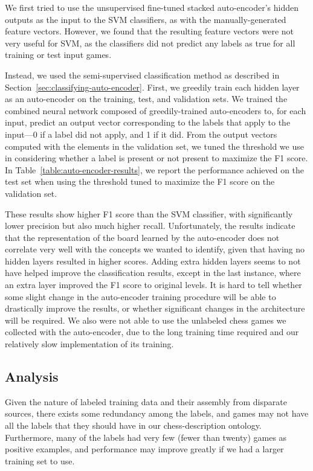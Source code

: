 \documentclass[11pt]{article}
\begin{document}
We first tried to use the unsupervised fine-tuned stacked auto-encoder's 
hidden outputs as the input to the SVM classifiers, as with the 
manually-generated feature vectors. However, we found that the resulting 
feature vectors were not very useful for SVM, as the classifiers did not 
predict any labels as true for all training or test input games.

Instead, we used the semi-supervised classification method as described 
in Section~\ref{sec:classifying-auto-encoder}. First, we greedily train 
each hidden layer as an auto-encoder on the training, test, and 
validation sets. We trained the combined neural network composed of 
greedily-trained auto-encoders to, for each input, predict an output 
vector corresponding to the labels that apply to the input---0 if a 
label did not apply, and 1 if it did. From the output vectors computed 
with the elements in the validation set, we tuned the threshold we use 
in considering whether a label is present or not present to maximize the 
F1 score. In Table~\ref{table:auto-encoder-results}, we report the 
performance achieved on the test set when using the threshold tuned to 
maximize the F1 score on the validation set.

These results show higher F1 score than the SVM classifier, with 
significantly lower precision but also much higher recall. 
Unfortunately, the results indicate that the representation of the board 
learned by the auto-encoder does not correlate very well with the 
concepts we wanted to identify, given that having no hidden layers 
resulted in higher scores. Adding extra hidden layers seems to not have 
helped improve the classification results, except in the last instance, 
where an extra layer improved the F1 score to original levels. It is 
hard to tell whether some slight change in the auto-encoder training 
procedure will be able to drastically improve the results, or whether 
significant changes in the architecture will be required. We also were 
not able to use the unlabeled chess games we collected with the 
auto-encoder, due to the long training time required and our relatively 
slow implementation of its training.

\subsection{Analysis}
Given the nature of labeled training data and their assembly from 
disparate sources, there exists some redundancy among the labels, and 
games may not have all the labels that they should have in our 
chess-description ontology. Furthermore, many of the labels had very few 
(fewer than twenty) games as positive examples, and performance may 
improve greatly if we had a larger training set to use.
\end{document}
